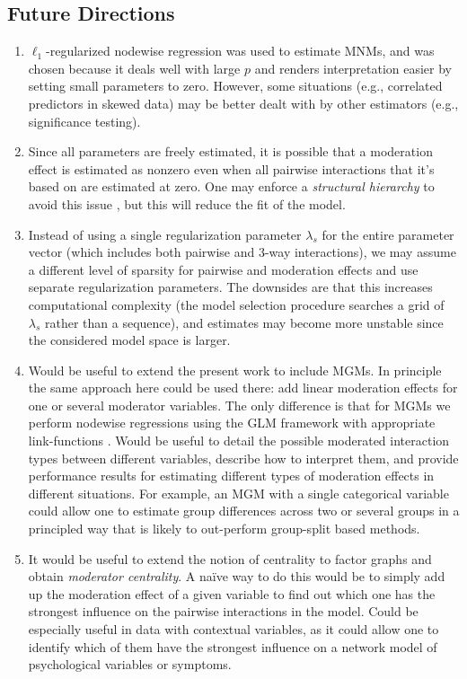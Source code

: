 \subsection{Future Directions}
\begin{enumerate}
    \item $\ell_1$-regularized nodewise regression was used to estimate MNMs, and was chosen because it deals well with large $p$ and renders interpretation easier by setting small parameters to zero. However, some situations (e.g., correlated predictors in skewed data) may be better dealt with by other estimators (e.g., significance testing).
    \item Since all parameters are freely estimated, it is possible that a moderation effect is estimated as nonzero even when all pairwise interactions that it's based on are estimated at zero. One may enforce a \textit{structural hierarchy} to avoid this issue \cite{bien2013lasso}, but this will reduce the fit of the model.
    \item Instead of using a single regularization parameter $\lambda_s$ for the entire parameter vector (which includes both pairwise and 3-way interactions), we may assume a different level of sparsity for pairwise and moderation effects and use separate regularization parameters. The downsides are that this increases computational complexity (the model selection procedure searches a grid of $\lambda_s$ rather than a sequence), and estimates may become more unstable since the considered model space is larger.
    \item Would be useful to extend the present work to include MGMs. In principle the same approach here could be used there: add linear moderation effects for one or several moderator variables. The only difference is that for MGMs we perform nodewise regressions using the GLM framework with appropriate link-functions \cite{nelder1972generalized}. Would be useful to detail the possible moderated interaction types between different variables, describe how to interpret them, and provide performance results for estimating different types of moderation effects in different situations. For example, an MGM with a single categorical variable could allow one to estimate group differences across two or several groups in a principled way that is likely to out-perform group-split based methods.
    \item It would be useful to extend the notion of centrality to factor graphs and obtain \textit{moderator centrality}. A na{\"i}ve way to do this would be to simply add up the moderation effect of a given variable to find out which one has the strongest influence on the pairwise interactions in the model. Could be especially useful in data with contextual variables, as it could allow one to identify which of them have the strongest influence on a network model of psychological variables or symptoms.
\end{enumerate}

